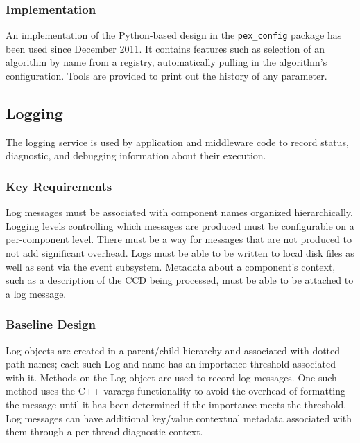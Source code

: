 \documentclass[DM,lsstdraft,toc]{lsstdoc}
\begin{document}
\subsubsection{Implementation}\label{configuration-implementation}

An implementation of the Python-based design in the \texttt{pex\_config}
package has been used since December 2011. It contains features such as
selection of an algorithm by name from a registry, automatically pulling in the
algorithm's configuration. Tools are provided to print out the history of any
parameter.


\subsection{Logging}\label{logging}

The logging service is used by application and middleware code to record
status, diagnostic, and debugging information about their execution.

\subsubsection{Key Requirements}\label{logging-reqs}

Log messages must be associated with component names organized
hierarchically. Logging levels controlling which messages are produced
must be configurable on a per-component level. There must be a way for
messages that are not produced to not add significant overhead.
Logs must be able to
be written to local disk files as well as sent via the event subsystem.
Metadata about a component's context, such as a description of the CCD
being processed, must be able to be attached to a log message.

\subsubsection{Baseline Design}\label{logging-design}

Log objects are created in a parent/child hierarchy and associated with
dotted-path names; each such Log and name has an importance threshold
associated with it. Methods on the Log object are used to record log messages.
One such method uses the C++ varargs functionality to avoid the overhead of
formatting the message until it has been determined if the importance meets the
threshold. Log messages can have additional key/value contextual metadata
associated with them through a per-thread diagnostic context.
\end{document}
